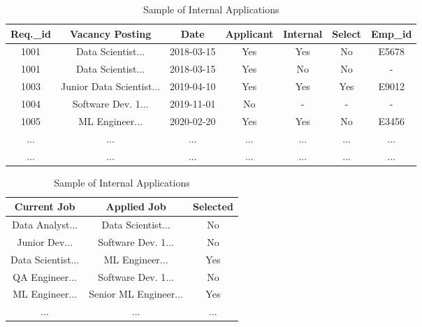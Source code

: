 \begin{table}[ht]
\centering
\small
\caption{Sample of Internal Job Postings Data}
\label{tab:job_postings}
\begin{tabular}{|c|c|c|c|c|c|c|}
\hline
Req.\_id & Vacancy Posting & Date & Applicant & Internal & Select & Emp\_id \\
\hline
1001 & Data Scientist... & 2018-03-15 & Yes & Yes & No & E5678 \\
1001 & Data Scientist... & 2018-03-15 & Yes & No & No & - \\
1003 & Junior Data Scientist... & 2019-04-10 & Yes & Yes & Yes & E9012 \\
1004 & Software Dev. 1... & 2019-11-01 & No & - & - & - \\
1005 & ML Engineer... & 2020-02-20 & Yes & Yes & No & E3456 \\
\multicolumn{1}{|c|}{...} & \multicolumn{1}{c|}{...} & \multicolumn{1}{c|}{...} & \multicolumn{1}{c|}{...} & \multicolumn{1}{c|}{...} & \multicolumn{1}{c|}{...} & \multicolumn{1}{c|}{...} \\
\multicolumn{1}{|c|}{...} & \multicolumn{1}{c|}{...} & \multicolumn{1}{c|}{...} & \multicolumn{1}{c|}{...} & \multicolumn{1}{c|}{...} & \multicolumn{1}{c|}{...} & \multicolumn{1}{c|}{...} \\
\hline
\end{tabular}
\vspace{0.5cm}
\caption{Sample of Internal Applications}
\label{tab:job_transitions}
\begin{tabular}{|c|c|c|}
\hline
Current Job & Applied Job & Selected \\
\hline
Data Analyst... & Data Scientist... & No \\
Junior Dev... & Software Dev. 1... & No \\
Data Scientist... & ML Engineer... & Yes \\
QA Engineer... & Software Dev. 1... & No \\
ML Engineer... & Senior ML Engineer... & Yes \\
\multicolumn{1}{|c|}{...} & \multicolumn{1}{c|}{...} & \multicolumn{1}{c|}{...} \\
\hline
\end{tabular}
\end{table}



